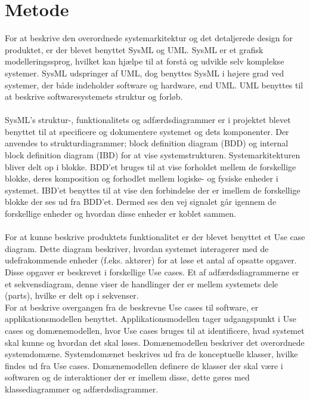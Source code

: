 \section{Metode}
\cite{SysML} For at beskrive den overordnede systemarkitektur og det detaljerede design for produktet, er der blevet benyttet SysML og UML. SysML er et grafisk modelleringssprog, hvilket kan hjælpe til at forstå og udvikle selv komplekse systemer. SysML udspringer af UML, dog benyttes SysML i højere grad ved systemer, der både indeholder software og hardware, end UML. UML benyttes til at beskrive softwaresystemets struktur og forløb. \cite{uml}
\\
\\
SysML’s struktur-, funktionalitets og adfærdsdiagrammer er i projektet blevet benyttet til at specificere og dokumentere systemet og dets komponenter. Der anvendes to strukturdiagrammer; block definition diagram (BDD) og internal block definition diagram (IBD) for at vise systemstrukturen. Systemarkitekturen bliver delt op i blokke. BDD'et bruges til at vise forholdet mellem de forskellige blokke, deres komposition og forhodlet mellem logiske- og fysiske enheder i systemet. IBD'et benyttes til at vise den forbindelse der er imellem de forskellige blokke der ses ud fra BDD'et. Dermed ses den vej signalet går igennem de forskellige enheder og hvordan disse enheder er koblet sammen.\\
\\
For at kunne beskrive produktets funktionalitet er der blevet benyttet et Use case diagram. Dette diagram beskriver, hvordan systemet interagerer med de udefrakommende enheder (f.eks. aktører) for at løse et antal af opsatte opgaver. Disse opgaver er beskrevet i forskellige Use cases. Et af adfærdsdiagrammerne er et sekvensdiagram, denne viser de handlinger der er mellem systemets dele (parts), hvilke er delt op i sekvenser.\\
For at beskrive overgangen fra de beskrevne Use cases til software, er applikationsmodellen benyttet. Applikationsmodellen tager udgangspunkt i Use cases og domænemodellen, hvor Use cases bruges til at identificere, hvad systemet skal kunne og hvordan det skal løses. Domænemodellen beskriver det overordnede systemdomæne. Systemdomænet beskrives ud fra de konceptuelle klasser, hvilke findes ud fra Use cases. Domænemodellen definere de klasser der skal være i softwaren og de interaktioner der er imellem disse, dette gøres med klassediagrammer og adfærdsdiagrammer. \\
\\
